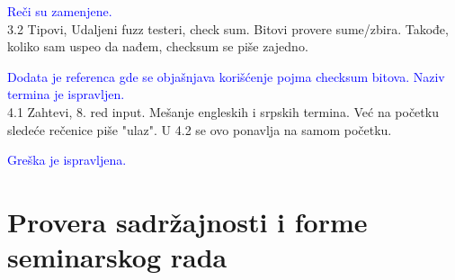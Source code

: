 \documentclass[a4paper]{report}
\newcommand{\odgovor}[1]{\textcolor{blue}{#1}}
\begin{document}
\odgovor{
Reči su zamenjene.
} \\

3.2 Tipovi, Udaljeni fuzz testeri, check sum. Bitovi provere sume/zbira. Takođe, koliko sam uspeo da nađem, checksum se piše zajedno. 

\odgovor{
Dodata je referenca gde se objašnjava korišćenje pojma checksum bitova.
Naziv termina je ispravljen. 
}\\


4.1 Zahtevi, 8. red input. Mešanje engleskih i srpskih termina. Već na početku sledeće rečenice piše "ulaz". U 4.2 se ovo ponavlja na samom početku.

\odgovor{
Greška je ispravljena.
}\\



\section{Provera sadržajnosti i forme seminarskog rada}
\end{document}
